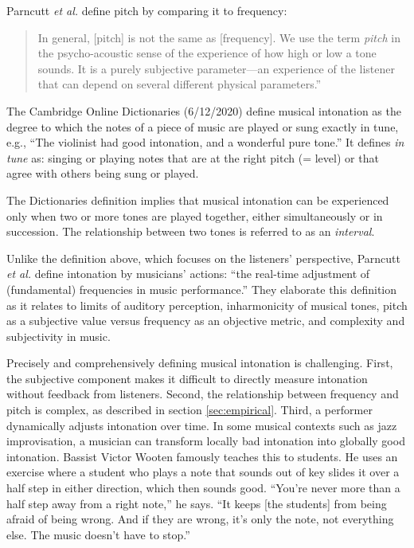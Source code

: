 Parncutt \textit{et al.} define pitch by comparing it to frequency: 
\begin{quotation}In general, [pitch] is not the same as [frequency]. We use the term \textit{pitch} in the psycho-acoustic sense of the experience of how high or low a tone sounds. It is a purely subjective parameter---an experience of the listener that can depend on several different physical parameters.'' \cite[][p.~477]{parncutt2018psychocultural}\end{quotation}

The Cambridge Online Dictionaries (6/12/2020) define musical intonation as the degree to which the notes of a piece of music are played or sung exactly in  tune,  e.g.,  ``The  violinist  had  good  intonation,  and a wonderful pure tone.'' It defines \textit{in tune} as: singing or playing notes that are at the right pitch (= level) or that agree with others being sung or played. 

The Dictionaries definition implies that musical intonation can be experienced only when two or more tones are played together, either simultaneously or in succession. The relationship between two tones is referred to as an \textit{interval}.

Unlike the definition above, which focuses on the listeners' perspective, Parncutt \textit{et al.} define intonation by musicians' actions: ``the real-time adjustment of (fundamental) frequencies in music performance.'' \cite[p.~477]{parncutt2018psychocultural} They elaborate this definition as it relates to limits of auditory perception, inharmonicity of musical tones, pitch as a subjective value versus frequency as an objective metric, and complexity and subjectivity in music.

Precisely and comprehensively defining musical intonation is challenging. First, the subjective component makes it difficult to directly measure intonation without feedback from listeners. Second, the relationship between frequency and pitch is complex, as described in section \ref{sec:empirical}. Third, a performer dynamically adjusts intonation over time. In some musical contexts such as jazz improvisation, a musician can transform locally bad intonation into globally good intonation. Bassist Victor Wooten famously teaches this to students. He uses an exercise where a student who plays a note that sounds out of key slides it over a half step in either direction, which then sounds good. ``You’re never more than a half step away from a right note,'' he says. ``It keeps [the students] from being afraid of being wrong. And if they are wrong, it’s only the note, not everything else. The music doesn’t have to stop.'' \cite{Freddy2020}

